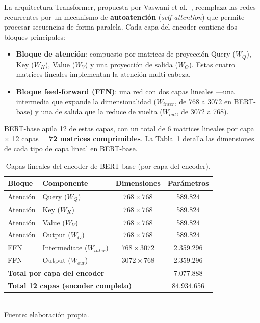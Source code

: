 \documentclass[11pt, a4paper]{article}
\begin{document}
La arquitectura Transformer, propuesta por Vaswani et al.\ \cite{vaswani2017attention}, reemplaza las redes recurrentes por un mecanismo de \textbf{autoatención} (\textit{self-attention}) que permite procesar secuencias de forma paralela. Cada capa del encoder contiene dos bloques principales:

\begin{itemize}[nosep]
    \item \textbf{Bloque de atención}: compuesto por matrices de proyección Query ($W_Q$), Key ($W_K$), Value ($W_V$) y una proyección de salida ($W_O$). Estas cuatro matrices lineales implementan la atención multi-cabeza.
    \item \textbf{Bloque feed-forward (FFN)}: una red con dos capas lineales ---una intermedia que expande la dimensionalidad ($W_{inter}$, de 768 a 3072 en BERT-base) y una de salida que la reduce de vuelta ($W_{out}$, de 3072 a 768).
\end{itemize}

BERT-base \cite{devlin2019bert} apila 12 de estas capas, con un total de 6 matrices lineales por capa $\times$ 12 capas = \textbf{72 matrices comprimibles}. La Tabla~\ref{tab:capas} detalla las dimensiones de cada tipo de capa lineal en BERT-base.

\begin{table}[H]
    \centering
    \caption{Capas lineales del encoder de BERT-base (por capa del encoder).}
    \label{tab:capas}
    \small
    \begin{tabular}{@{}l l c c@{}}
        \toprule
        \textbf{Bloque} & \textbf{Componente} & \textbf{Dimensiones} & \textbf{Parámetros} \\
        \midrule
        Atención & Query ($W_Q$)           & $768 \times 768$  & 589.824 \\
        Atención & Key ($W_K$)             & $768 \times 768$  & 589.824 \\
        Atención & Value ($W_V$)           & $768 \times 768$  & 589.824 \\
        Atención & Output ($W_O$)          & $768 \times 768$  & 589.824 \\
        FFN      & Intermediate ($W_{inter}$)  & $768 \times 3072$ & 2.359.296 \\
        FFN      & Output ($W_{out}$)      & $3072 \times 768$ & 2.359.296 \\
        \midrule
        \multicolumn{3}{l}{\textbf{Total por capa del encoder}} & 7.077.888 \\
        \multicolumn{3}{l}{\textbf{Total 12 capas (encoder completo)}} & 84.934.656 \\
        \bottomrule
    \end{tabular}
    \\[0.15cm]{\small Fuente: elaboración propia.}
\end{table}
\end{document}
